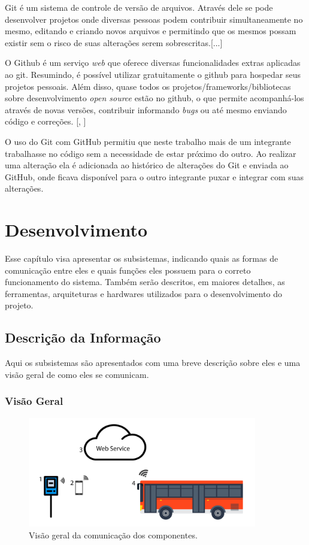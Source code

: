 \documentclass[
	12pt,				%
	oneside,			%
	a4paper,			%
	brazil				%
]{abntex2}
\newcommand{\citecustom}[1]{[\citeauthoronline{#1}, \citeyear{#1}]}
\begin{document}
{\begin{citacao}
Git é um sistema de controle de versão de arquivos. Através dele se pode desenvolver projetos onde diversas pessoas podem contribuir simultaneamente no mesmo, editando e criando novos arquivos e permitindo que os mesmos possam existir sem o risco de suas alterações serem sobrescritas.[...]

O Github é um serviço \textit{web} que oferece diversas funcionalidades extras aplicadas ao git. Resumindo, é possível utilizar gratuitamente o github para hospedar seus projetos pessoais. Além disso, quase todos os projetos/frameworks/bibliotecas sobre desenvolvimento \textit{open source} estão no github, o que permite acompanhá-los através de novas versões, contribuir informando \textit{bugs} ou até mesmo enviando código e correções. \citecustom{Schmitz2015}
\end{citacao}

O uso do Git com GitHub permitiu que neste trabalho mais de um integrante trabalhasse no código sem a necessidade de estar próximo do outro. Ao realizar uma alteração ela é adicionada ao histórico de alterações do Git e enviada ao GitHub, onde ficava disponível para o outro integrante puxar e integrar com suas alterações.


\chapter{Desenvolvimento}

Esse capítulo visa apresentar os subsistemas, indicando quais as formas de comunicação entre eles e quais funções eles possuem para o correto funcionamento do sistema. Também serão descritos, em maiores detalhes, as ferramentas, arquiteturas e hardwares utilizados para o desenvolvimento do projeto.

\section{Descrição da Informação}

Aqui os subsistemas são apresentados com uma breve descrição sobre eles e uma visão geral de como eles se comunicam.

\subsection{Visão Geral}

\begin{figure}[!h]
\centering
\includegraphics[width=10cm, center]{images/relations_system.jpg}
\caption{Visão geral da comunicação dos componentes.}
\label{Rotulo}
\end{figure}

}
\end{document}
